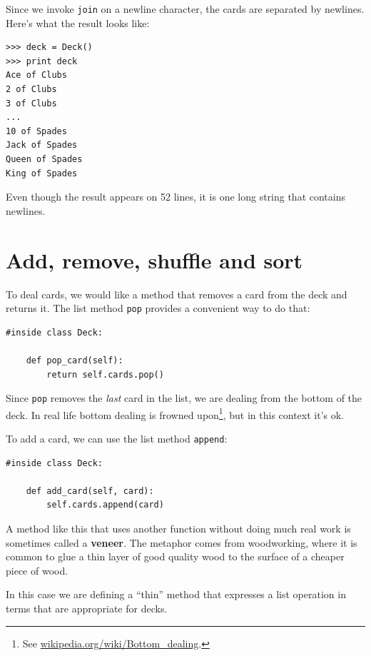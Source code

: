 \documentclass[10pt]{book}
\begin{document}

Since we invoke {\tt join} on a newline character, the cards
are separated by newlines.  Here's what the result looks like:

\beforeverb
\begin{verbatim}
>>> deck = Deck()
>>> print deck
Ace of Clubs
2 of Clubs
3 of Clubs
...
10 of Spades
Jack of Spades
Queen of Spades
King of Spades
\end{verbatim}
\afterverb
%
Even though the result appears on 52 lines, it is
one long string that contains newlines.


\section{Add, remove, shuffle and sort}

To deal cards, we would like a method that
removes a card from the deck and returns it.
The list method {\tt pop} provides a convenient way to do that:


\beforeverb
\begin{verbatim}
#inside class Deck:

    def pop_card(self):
        return self.cards.pop()
\end{verbatim}
\afterverb
%
Since {\tt pop} removes the {\em last} card in the list, we are
dealing from the bottom of the deck.  In real life bottom dealing is
frowned upon\footnote{See \url{wikipedia.org/wiki/Bottom_dealing}.},
but in this context it's ok.


To add a card, we can use the list method {\tt append}:

\beforeverb
\begin{verbatim}
#inside class Deck:

    def add_card(self, card):
        self.cards.append(card)
\end{verbatim}
\afterverb
%
A method like this that uses another function without doing
much real work is sometimes called a {\bf veneer}.  The metaphor
comes from woodworking, where it is common to glue a thin
layer of good quality wood to the surface of a cheaper piece of
wood.


In this case we are defining a ``thin'' method that expresses
a list operation in terms that are appropriate for decks.
\end{document}
